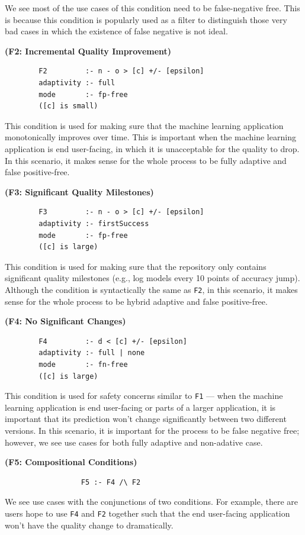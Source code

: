 \documentclass{article}
\begin{document}
We see most of the use cases of this condition 
need to be false-negative free. This is because 
this condition is popularly used as a filter to
distinguish those very bad cases in which the
existence of false negative is not ideal.

\vspace{1em}
\noindent 
{\bf (F2: Incremental Quality Improvement)}
\begin{verbatim}
        F2         :- n - o > [c] +/- [epsilon]
        adaptivity :- full
        mode       :- fp-free
        ([c] is small)
\end{verbatim}
This condition is used for making sure that the
machine learning application monotonically improves
over time. This is important when the machine
learning application is end user-facing, in which 
it is unacceptable for the quality to drop.
In this scenario, it makes sense for the whole
process to be fully adaptive and false positive-free.

\vspace{1em}
\noindent 
{\bf (F3: Significant Quality Milestones)}
\begin{verbatim}
        F3         :- n - o > [c] +/- [epsilon]
        adaptivity :- firstSuccess
        mode       :- fp-free
        ([c] is large)
\end{verbatim}
This condition is used for making sure that the
repository only contains significant quality
milestones (e.g., log models every 10 points
of accuracy jump). Although the condition is
syntactically the same as \texttt{F2}, in this
scenario, it makes sense for the whole
process to be hybrid adaptive and false positive-free.

\vspace{1em}
\noindent 
{\bf (F4: No Significant Changes)}
\begin{verbatim}
        F4         :- d < [c] +/- [epsilon]
        adaptivity :- full | none
        mode       :- fn-free
        ([c] is large)
\end{verbatim}
This condition is used for safety concerns 
similar to \texttt{F1} --- when the machine
learning application is end user-facing or
parts of a larger application, it is important
that its prediction won't change significantly
between two different versions. In this scenario,
it is important for the process to be false negative
free; however, we see use cases for both
fully adaptive and non-adative case.

\vspace{1em}
\noindent 
{\bf (F5: Compositional Conditions)}
\begin{verbatim}
                  F5 :- F4 /\ F2
\end{verbatim}
We see use cases with the conjunctions of two
conditions. For example, there are users hope to 
use \texttt{F4} and \texttt{F2} together such that
the end user-facing application won't have the quality
change to dramatically.
\end{document}

